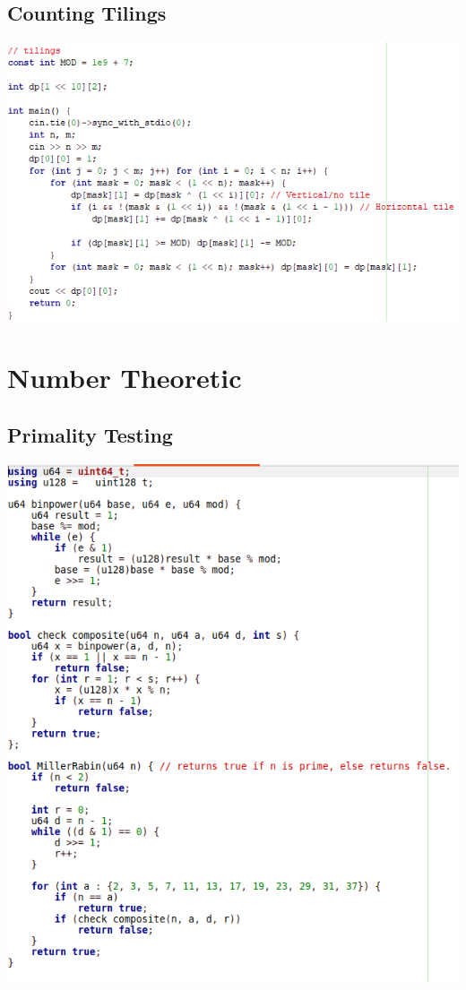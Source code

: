 \documentclass[11pt,twocolumn]{article}
\begin{document}
\subsection{Counting Tilings}
\includegraphics[scale=0.6]{tilings}
\section{Number Theoretic}
\subsection{Primality Testing}

\includegraphics[scale=0.5]{millerrabin}
\end{document}
